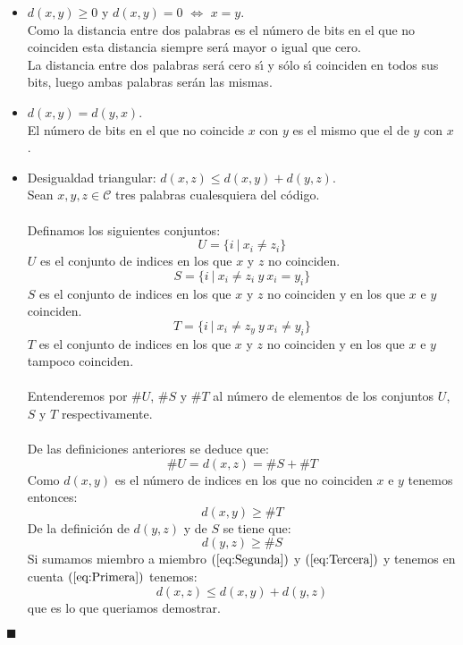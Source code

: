 \begin{itemize}
\item $d(x,y)\geq 0$ y $d(x,y)=0$ $\Longleftrightarrow$ $x=y$.\\

Como la distancia entre dos palabras es el n\'umero de bits en el que no
coinciden esta distancia siempre ser\'a mayor o igual que cero.\\

La distancia entre dos palabras ser\'a cero s\'{\i} y s\'olo s\'{\i} coinciden
en todos sus bits, luego ambas palabras ser\'an las mismas.
\item $d(x,y)=d(y,x)$.\\

El n\'umero de bits en el que no coincide $x$ con $y$ es el mismo que el de $y$
con $x$.
%
\newpage
%
\item Desigualdad triangular: $d(x,z)\leq d(x,y)+d(y,z)$.\\

Sean $x,y,z\in \mathcal{C}$ tres palabras cualesquiera del c\'odigo.\\ \\
%
Definamos los siguientes conjuntos:
\begin{displaymath}
U=\{i\ |\ x_i\neq z_i \}
\end{displaymath}
$U$ es el conjunto de indices en los que $x$ y $z$ no coinciden.
\begin{displaymath}
S=\{i\ |\ x_i\neq z_i\ y\ x_i=y_i \}
\end{displaymath}
$S$ es el conjunto de indices en los que $x$ y $z$ no coinciden y en los que
$x$ e $y$ coinciden.
\begin{displaymath}
T=\{i\ |\ x_i\neq z_y\ y\ x_i\neq y_i\}
\end{displaymath}
$T$ es el conjunto de indices en los que $x$ y $z$ no coinciden y en los que
$x$ e $y$ tampoco coinciden.\\ \\
%
Entenderemos por $\#U$, $\#S$ y $\#T$ al n\'umero de elementos de los conjuntos
$U$, $S$ y $T$ respectivamente.\\ \\
%
De las definiciones anteriores se deduce que:
\begin{equation}\label{eq:Primera}
\#U=d(x,z)=\#S+\#T
\end{equation}
Como $d(x,y)$ es el n\'umero de indices en los que no coinciden $x$ e $y$
tenemos entonces:
\begin{equation}\label{eq:Segunda}
d(x,y)\geq \#T
\end{equation}
De la definici\'on de $d(y,z)$ y de $S$ se tiene que:
\begin{equation}\label{eq:Tercera}
d(y,z)\geq \#S
\end{equation}
Si sumamos miembro a miembro $(\ref{eq:Segunda})$ y $(\ref{eq:Tercera})$ y
tenemos en cuenta $(\ref{eq:Primera})$ tenemos: $$d(x,z)\leq d(x,y)+d(y,z)$$
que es lo que queriamos demostrar.
\end{itemize}
\begin{flushright}
$\blacksquare$
\end{flushright}
%
\newpage
%

